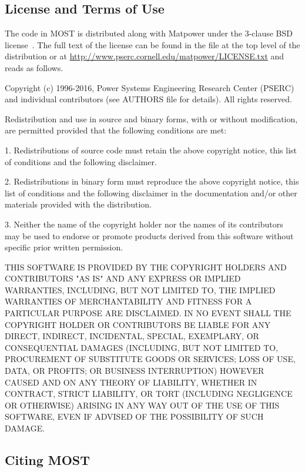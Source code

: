 \documentclass[12pt]{article}
\newcommand{\matpower}[0]{{\sc Matpower}}
\newcommand{\most}[0]{{MOST}}
\newcommand{\code}[1]{{\relsize{-0.5}{\tt{{#1}}}}}  %
\numberwithin{equation}{section}
\numberwithin{table}{section}
\numberwithin{figure}{section}
\begin{document}
\subsection{License and Terms of Use}

The code in \most{} is distributed along with \matpower{} under the 3-clause BSD license~\cite{bsd}. The full text of the license can be found in the \code{LICENSE} file at the top level of the distribution or at \url{http://www.pserc.cornell.edu/matpower/LICENSE.txt} and reads as follows.

\begin{Notice}
Copyright (c) 1996-2016, Power Systems Engineering Research Center
(PSERC) and individual contributors (see AUTHORS file for details).
All rights reserved.

Redistribution and use in source and binary forms, with or without
modification, are permitted provided that the following conditions
are met:

1. Redistributions of source code must retain the above copyright
notice, this list of conditions and the following disclaimer.

2. Redistributions in binary form must reproduce the above copyright
notice, this list of conditions and the following disclaimer in the
documentation and/or other materials provided with the distribution.

3. Neither the name of the copyright holder nor the names of its
contributors may be used to endorse or promote products derived from
this software without specific prior written permission.

THIS SOFTWARE IS PROVIDED BY THE COPYRIGHT HOLDERS AND CONTRIBUTORS
"AS IS" AND ANY EXPRESS OR IMPLIED WARRANTIES, INCLUDING, BUT NOT
LIMITED TO, THE IMPLIED WARRANTIES OF MERCHANTABILITY AND FITNESS
FOR A PARTICULAR PURPOSE ARE DISCLAIMED. IN NO EVENT SHALL THE
COPYRIGHT HOLDER OR CONTRIBUTORS BE LIABLE FOR ANY DIRECT, INDIRECT,
INCIDENTAL, SPECIAL, EXEMPLARY, OR CONSEQUENTIAL DAMAGES (INCLUDING,
BUT NOT LIMITED TO, PROCUREMENT OF SUBSTITUTE GOODS OR SERVICES;
LOSS OF USE, DATA, OR PROFITS; OR BUSINESS INTERRUPTION) HOWEVER
CAUSED AND ON ANY THEORY OF LIABILITY, WHETHER IN CONTRACT, STRICT
LIABILITY, OR TORT (INCLUDING NEGLIGENCE OR OTHERWISE) ARISING IN
ANY WAY OUT OF THE USE OF THIS SOFTWARE, EVEN IF ADVISED OF THE
POSSIBILITY OF SUCH DAMAGE.
\end{Notice}

\subsection{Citing \most{}}
\end{document}
